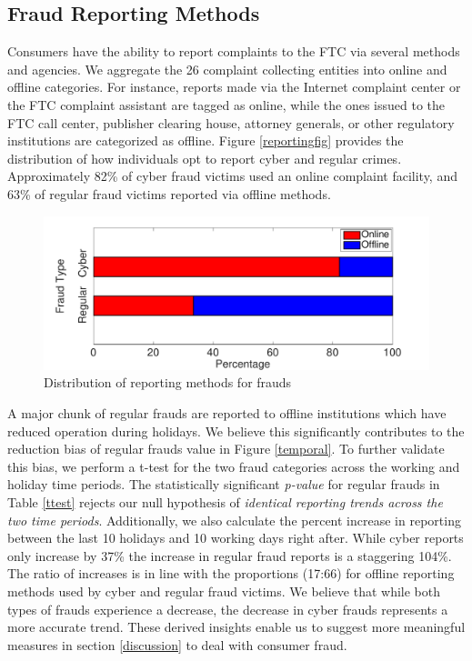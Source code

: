 \documentclass[conference]{IEEEtran}
\begin{document}
\subsection{Fraud Reporting Methods}\label{reportingmethods}
Consumers have the ability to report complaints to the FTC via several methods and agencies. We aggregate the 26 complaint collecting entities into online and offline categories. For instance, reports made via the Internet complaint center or the FTC complaint assistant are tagged as online, while the ones issued to the FTC call center, publisher clearing house, attorney generals, or other regulatory institutions are categorized as offline. Figure \ref{reportingfig} provides the distribution of how individuals opt to report cyber and regular crimes. Approximately 82\% of cyber fraud victims used an online complaint facility, and 63\% of regular fraud victims reported via offline methods.


 \begin{figure}[b]
\centering
  \includegraphics[scale=0.35]{graphics/reporting_methods.pdf}
  \caption{Distribution of reporting methods for frauds}
  \label{cdffig}
\end{figure}

A major chunk of regular frauds are reported to offline institutions which have reduced operation during holidays. We believe this significantly contributes to the reduction bias of regular frauds value in Figure \ref{temporal}. To further validate this bias, we perform a t-test for the two fraud categories across the working and holiday time periods. The statistically significant \emph{p-value} for regular frauds in Table \ref{ttest} rejects our null hypothesis of \emph{identical reporting trends across the two time periods}. Additionally, we also calculate the percent increase in reporting between the last 10 holidays and 10 working days right after. While cyber reports only increase by 37\% the increase in regular fraud reports is a staggering 104\%. The ratio of increases is in line with the proportions (17:66) for offline reporting methods used by cyber and regular fraud victims. We believe that while both types of frauds experience a decrease, the decrease in cyber frauds represents a more accurate trend. These derived insights enable us to suggest more meaningful measures in section \ref{discussion} to deal with consumer fraud.
\end{document}
